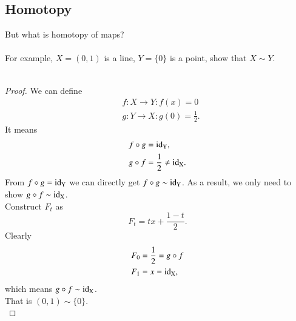 \documentclass[openany,10pt]{book}
\theoremstyle{definition}
\theoremstyle{definition}
\theoremstyle{remark}
\begin{document}
\subsection{Homotopy}
But what is homotopy of maps? 
\\\\
For example, $X=(0,1)$ is a line, $Y=\{0\}$ is a point, show that $X\sim Y$.\\\\
\begin{proof}

We can define 
\begin{equation}
    \begin{aligned}
        &f:X\to Y:f(x)=0\\
        &g:Y\to X:g(0)=\frac{1}{2}.
    \end{aligned}
\end{equation}
It means 
\begin{equation}
    \begin{aligned}
    f\circ g&={\rm{id_Y}},\\
    g\circ f&=\frac{1}{2}\neq{\rm{id_X}}.
    \end{aligned}
\end{equation}
From $ f\circ g={\rm{id_Y}}$ we can directly get  $f\circ g\sim{\rm{id_Y}}$. As a result, we only need to show $g\circ f\sim{\rm{id_X}}$.\\
Construct $F_t$ as 
\begin{equation}
    F_t=tx+\frac{1-t}{2}.
\end{equation}
Clearly 
\begin{equation}
    \begin{aligned}
    F_0&=\frac{1}{2}=g\circ f\\
    F_1&=x={\rm{id_X}},
    \end{aligned}
\end{equation}
which means $g\circ f\sim {\rm{id_X}}$.\\
That is $(0,1)\sim \{0\}$.\\
\end{proof} 
\end{document}
